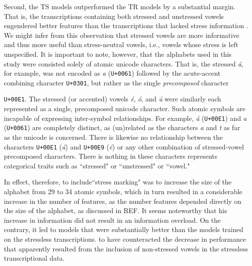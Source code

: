 Second, the TS models outperformed the TR models by a substantial margin. That is, 
the transcriptions containing both stressed and unstressed vowels engendered better features than  the
transcriptions that lacked stress information . We might infer from this observation that stressed vowels are more informative and thus more useful than 
stress-neutral vowels, i.e., vowels whose stress is left unspecified.  It is important to note, however, that the alphabets used in this study were consisted solely of atomic unicode characters. That is, the stressed \textit{\'a}, 
for example, was not encoded as \textit{a} (\texttt{U+0061}) followed by the acute-accent combining character \texttt{U+0301}, but 
rather as the single \emph{precomposed} character{\texttt{U+00E1}. The stressed (or accented) vowels \textit{\'e}, \textit{\'o}, and \textit{\'u} were similarly each represented as a single, precomposed unicode character. 
Such atomic symbols are incapable of expressing inter-symbol relationships. For example, \textit{\'a} (\texttt{U+00E1}) and \textit{a} (\texttt{U+0061}) are completely distinct, as (un)related as the characters \textit{a} and \textit{t} as far as the unicode is concerned.
There is likewise
no relationship between the characters \texttt{U+00E1} (\textit{\'a}) and  
\texttt{U+00E9} (\textit{\'e}) or any other combination of stressed-vowel 
precomposed characters. There is nothing in these characters represents 
categorical traits such as ``stressed" or ``unstressed" or ``vowel."  

In effect, therefore, to include``stress marking" was to increase the size of the 
alphabet from 29 to 34 atomic symbols, which
in turn resulted in a considerable increase in the number of features, as the number features depended 
directly on the size of the alphabet, as discussed in REF. It seems noteworthy that his increase in information did not result in an
information overload. On the contrary, it led to models that were substantially 
better than the models trained on the stressless transcriptions.  to have counteracted the decrease in 
performance that apparently resulted from the inclusion of non-stressed vowels in the stressless transcriptional data. 




























}
